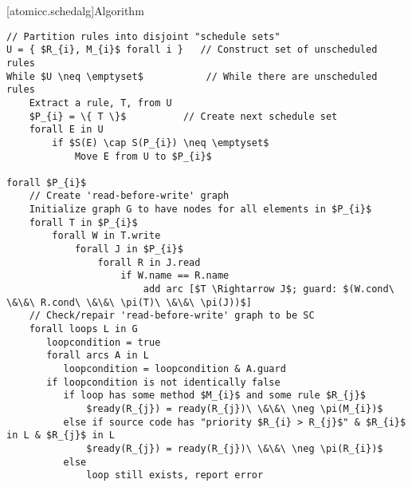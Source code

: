 [atomicc.schedalg]{Algorithm}

\begin{lstlisting}[mathescape=true]
// Partition rules into disjoint "schedule sets"
U = { $R_{i}, M_{i}$ forall i }   // Construct set of unscheduled rules
While $U \neq \emptyset$           // While there are unscheduled rules
    Extract a rule, T, from U
    $P_{i} = \{ T \}$          // Create next schedule set
    forall E in U
        if $S(E) \cap S(P_{i}) \neq \emptyset$
            Move E from U to $P_{i}$

forall $P_{i}$
    // Create 'read-before-write' graph
    Initialize graph G to have nodes for all elements in $P_{i}$
    forall T in $P_{i}$
        forall W in T.write
            forall J in $P_{i}$
                forall R in J.read
                    if W.name == R.name
                        add arc [$T \Rightarrow J$; guard: $(W.cond\ \&\&\ R.cond\ \&\&\ \pi(T)\ \&\&\ \pi(J))$]
    // Check/repair 'read-before-write' graph to be SC
    forall loops L in G
       loopcondition = true
       forall arcs A in L 
          loopcondition = loopcondition & A.guard
       if loopcondition is not identically false
          if loop has some method $M_{i}$ and some rule $R_{j}$
              $ready(R_{j}) = ready(R_{j})\ \&\&\ \neg \pi(M_{i})$
          else if source code has "priority $R_{i} > R_{j}$" & $R_{i}$ in L & $R_{j}$ in L
              $ready(R_{j}) = ready(R_{j})\ \&\&\ \neg \pi(R_{i})$
          else
              loop still exists, report error
\end{lstlisting}

